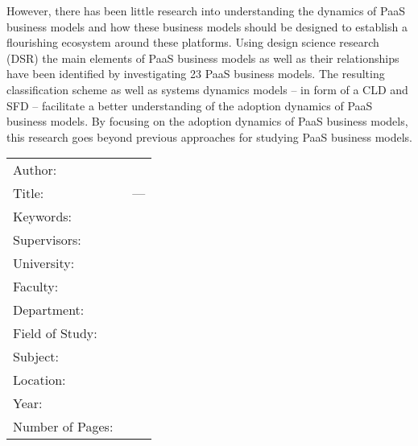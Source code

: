 However, there has been little research into understanding the dynamics of \ac{PaaS} business models and how these business models should be designed to establish a flourishing ecosystem around these platforms. Using design science research (DSR) the main elements of \ac{PaaS} business models as well as their relationships have been identified by investigating 23 PaaS business models. The resulting classification scheme as well as systems dynamics models -- in form of a \ac{CLD} and \ac{SFD} -- facilitate a better understanding of the adoption dynamics of \ac{PaaS} business models. By focusing on the adoption dynamics of \ac{PaaS} business models, this research goes beyond previous approaches for studying \ac{PaaS} business models.

\vspace*{5mm}

\footnotesize
\noindent \hspace{-3mm}
\begin{tabular}{L{.23\textwidth}L{.75\textwidth}}
	Author: & \myName \\
	Title: & \myTitle ~--- \mySubtitle \\
	Keywords: & \myKeywords \\
	Supervisors: &\mySupervisor \\
	University: & \myUni \\
	Faculty: & \myFaculty \\
	Department: & \myDepartment \\
	Field of Study: & \myDegree \\ 
	Subject: & \mySubject\\
	Location: & \myLocation \\
	Year: & \myTime \\
	Number of Pages: & \pageref{LastPage}
\end{tabular}

\normalsize